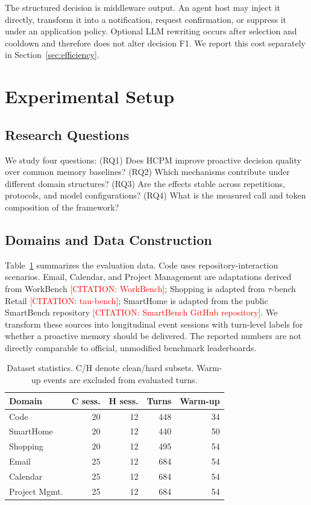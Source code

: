 \documentclass[sigconf,anonymous,review]{acmart}
\newcommand{\citetodo}[1]{\textcolor{red}{[CITATION: #1]}}
\newcommand{\system}{HCPM}
\begin{document}
The structured decision is middleware output.
An agent host may inject it directly, transform it into a notification, request confirmation, or suppress it under an application policy.
Optional LLM rewriting occurs after selection and cooldown and therefore does not alter decision F1.
We report this cost separately in Section~\ref{sec:efficiency}.

\section{Experimental Setup}

\subsection{Research Questions}

We study four questions: (RQ1) Does \system{} improve proactive decision quality over common memory baselines? (RQ2) Which mechanisms contribute under different domain structures? (RQ3) Are the effects stable across repetitions, protocols, and model configurations? (RQ4) What is the measured call and token composition of the framework?

\subsection{Domains and Data Construction}

Table~\ref{tab:data} summarizes the evaluation data.
Code uses repository-interaction scenarios.
Email, Calendar, and Project Management are adaptations derived from WorkBench \citetodo{WorkBench}; Shopping is adapted from $\tau$-bench Retail \citetodo{tau-bench}; SmartHome is adapted from the public SmartBench repository \citetodo{SmartBench GitHub repository}.
We transform these sources into longitudinal event sessions with turn-level labels for whether a proactive memory should be delivered.
The reported numbers are not directly comparable to official, unmodified benchmark leaderboards.

\begin{table}[t]
\centering
\caption{Dataset statistics. C/H denote clean/hard subsets. Warm-up events are excluded from evaluated turns.}
\label{tab:data}
\small
\begin{tabular}{lrrrr}
\toprule
Domain & C sess. & H sess. & Turns & Warm-up \\
\midrule
Code & 20 & 12 & 448 & 34 \\
SmartHome & 20 & 12 & 440 & 50 \\
Shopping & 20 & 12 & 495 & 54 \\
Email & 25 & 12 & 684 & 54 \\
Calendar & 25 & 12 & 684 & 54 \\
Project Mgmt. & 25 & 12 & 684 & 54 \\
\bottomrule
\end{tabular}
\end{table}
\end{document}
